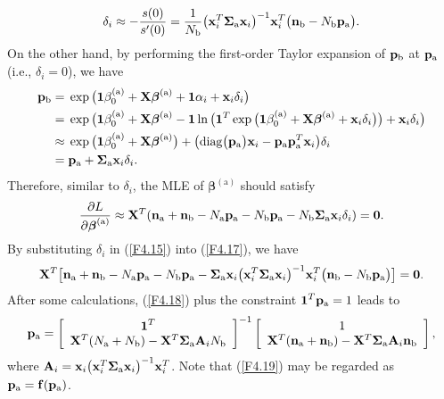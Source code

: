 \begin{align}
\delta_i\approx-\frac{s(0)}{s^{\prime}(0)}=\frac{1}{N_{\mathrm{b}}}\big({\bf
x}_i^T\bm{\Sigma}_{\mathrm{a}}{\bf x}_i\big)^{-1}{\bf x}_i^T\big({\bf
n}_{\mathrm{b}}-N_{\mathrm{b}}{\bf p}_{\mathrm{a}}\big).\label{F4.15}
\end{align}
On the other hand, by performing the first-order Taylor expansion of ${\bf
p}_{\mathrm{b}}$ at ${\bf p}_{\mathrm{a}}$ (i.e., $\delta_i=0$), we have
\begin{align}
{\bf p}_{\mathrm{b}}=&\;\exp\big(\bm{1}\beta^{(\mathrm{a})}_0+{\bf
X}\bm\beta^{(\mathrm{a})}+\bm{1}\alpha_i+{\bf
x}_i\delta_i\big)\nonumber\\
=&\;\exp\big(\bm{1}\beta^{(\mathrm{a})}_0+{\bf X}\bm\beta^{(\mathrm{a})}-
\bm{1}\ln\big(\bm{1}^T\exp\big(\bm{1}\beta^{(\mathrm{a})}_0 +{\bf
X}\bm\beta^{(\mathrm{a})}+{\bf x}_i\delta_i\big)\big)+{\bf
x}_i\delta_i\big)\nonumber\\
\approx &\;\exp\big(\bm{1}\beta^{(\mathrm{a})}_0+{\bf
X}\bm\beta^{(\mathrm{a})}\big)+\big(\di\big({\bf p}_{\mathrm{a}}\big){\bf
x}_i-{\bf p}_{\mathrm{a}}{\bf p}_{\mathrm{a}}^T{\bf x}_i\big)\delta_i\nonumber\\
=&\;{\bf p}_{\mathrm{a}}+\bm{\Sigma}_{\mathrm{a}}{\bf x}_i\delta_i.\label{F4.16}
\end{align}
Therefore, similar to $\delta_i$, the MLE of $\bm\beta^{(\mathrm{a})}$ should
satisfy
\begin{align}
\frac{\partial L}{\partial\bm\beta^{(\mathrm{a})}}\approx{\bf X}^T({\bf
n}_{\mathrm{a}}+{\bf n}_{\mathrm{b}}-N_{\mathrm{a}}{\bf
p}_{\mathrm{a}}-N_{\mathrm{b}}{\bf
p}_{\mathrm{a}}-N_{\mathrm{b}}\bm{\Sigma}_{\mathrm{a}}{\bf x}_i\delta_i)=\bm
0.\label{F4.17}
\end{align}
By substituting $\delta_i$ in (\ref{F4.15}) into (\ref{F4.17}), we have
\begin{align}
{\bf X}^T\big[{\bf n}_{\mathrm{a}}+{\bf n}_{\mathrm{b}}-N_{\mathrm{a}}{\bf
p}_{\mathrm{a}}-N_{\mathrm{b}}{\bf p}_{\mathrm{a}}-\bm{\Sigma}_{\mathrm{a}}{\bf
x}_i\big({\bf x}_i^T\bm{\Sigma}_{\mathrm{a}}{\bf x}_i\big)^{-1}{\bf x}_i^T\big({\bf
n}_{\mathrm{b}}-N_{\mathrm{b}}{\bf p}_{\mathrm{a}}\big)\big]=\bm 0.\label{F4.18}
\end{align}
After some calculations, (\ref{F4.18}) plus the constraint $\boldsymbol 1^T{\bf
p}_{\mathrm{a}}=1$ leads to
\begin{align}
{\bf p}_{\mathrm{a}}=\left[\begin{array}{c} \bm 1^T\\
{\bf X}^T(N_{\mathrm{a}}+N_{\mathrm{b}})-{\bf X}^T\bm{\Sigma}_{\mathrm{a}}{\bf
A}_iN_{\mathrm{b}}
\end{array}\right]^{-1}\left[\begin{array}{c}1\\
{\bf X}^T({\bf n}_{\mathrm{a}}+{\bf n}_{\mathrm{b}})-{\bf
X}^T\bm{\Sigma}_{\mathrm{a}}{\bf A}_i{\bf n}_{\mathrm{b}}
\end{array}\right],\label{F4.19}
\end{align}
where ${\bf A}_i={\bf x}_i\big({\bf x}_i^T\boldsymbol{\Sigma}_{\mathrm{a}}{\bf
x}_i\big)^{-1}{\bf x}_i^T$. Note that (\ref{F4.19}) may be regarded as ${\bf
p}_{\mathrm{a}}={\bf f}({\bf p}_{\mathrm{a}})$.

